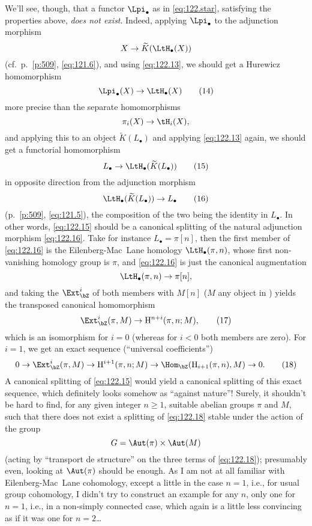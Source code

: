 We'll see, though, that a functor $\Lpi_\bullet$ as in
\eqref{eq:122.star}, satisfying the properties above, \emph{does not
  exist}. Indeed, applying $\Lpi_\bullet$ to the adjunction morphism
\[X\to \widetilde K(\LtH_\bullet(X))\]
(cf.\ p.~\ref{p:509}, \eqref{eq:121.6}), and using \eqref{eq:122.13},
we should get a Hurewicz homomorphism
\begin{equation}
  \label{eq:122.14}
  \Lpi_\bullet(X)\to\LtH_\bullet(X)\tag{14}
\end{equation}
more precise than the separate homomorphisms
\[\pi_i(X)\to\tH_i(X),\]
and applying this to an object $\widetilde K(L_\bullet)$ and applying
\eqref{eq:122.13} again, we should get a functorial homomorphism
\begin{equation}
  \label{eq:122.15}
  L_\bullet \to \LtH_\bullet(\widetilde K(L_\bullet))\tag{15}
\end{equation}
in opposite direction from the adjunction morphism
\begin{equation}
  \label{eq:122.16}
  \LtH_\bullet(\widetilde K(L_\bullet)) \to L_\bullet\tag{16}
\end{equation}
(p.~\ref{p:509}, \eqref{eq:121.5}), the composition of the two being
the identity in $L_\bullet$. In other words, \eqref{eq:122.15} should
be a canonical splitting of the natural adjunction morphism
\eqref{eq:122.16}. Take for instance $L_\bullet=\pi[n]$, then the
first member of \eqref{eq:122.16} is the Eilenberg-Mac~Lane homology
$\LtH_\bullet(\pi,n)$, whose first non-vanishing homology group is
$\pi$, and \eqref{eq:122.16} is just the canonical augmentation
\[\LtH_\bullet(\pi,n)\to\pi[n],\]
and taking the $\Ext_\bZ^i$ of both members with $M[n]$ ($M$ any
object in \Ab) yields the transposed canonical homomorphism
\begin{equation}
  \label{eq:122.17}
  \Ext_\bZ^i(\pi,M)\to\mathrm H^{n+i}(\pi,n;M),\tag{17}
\end{equation}
which is an isomorphism for $i=0$ (whereas for $i<0$ both members are
zero). For $i=1$, we get an exact sequence (``universal
coefficients'')
\begin{equation}
  \label{eq:122.18}
  0 \to \Ext_\bZ^i(\pi,M) \to \mathrm H^{i+1}(\pi,n;M) \to
  \Hom_\bZ(\mathrm H_{i+1}(\pi,n), M) \to 0.\tag{18}
\end{equation}
A canonical splitting of \eqref{eq:122.15} would yield a canonical
splitting of this exact sequence, which definitely looks somehow as
``against nature''! Surely, it shouldn't be hard to find, for any
given integer $n\ge1$, suitable abelian groups $\pi$ and $M$, such
that there does not exist a splitting of \eqref{eq:122.18} stable
under the action of the group
\[G = \Aut(\pi) \times \Aut(M)\]
(acting by ``transport de structure'' on the three terms of
\eqref{eq:122.18}); presumably even, looking at $\Aut(\pi)$ should be
enough. As I am not at all familiar with Eilenberg-Mac~Lane
cohomology, except a little in the case $n=1$, i.e., for usual group
cohomology, I didn't try to construct an example for any $n$, only one
for $n=1$, i.e., in a non-simply connected case, which again is a
little less convincing as if it was one for $n=2$\dots


